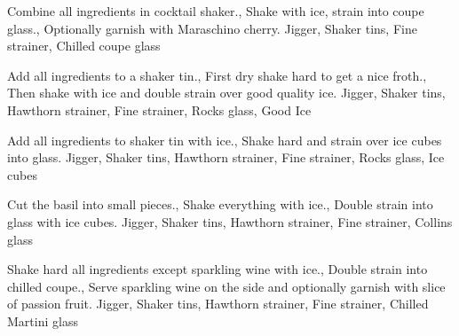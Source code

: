 \documentclass[../main.tex]{subfiles}
\begin{document}

    {
            {Combine all ingredients in cocktail shaker.},
            {Shake with ice, strain into coupe glass.},
            {Optionally garnish with Maraschino cherry.}
    }
    {Jigger, Shaker tins, Fine strainer, Chilled coupe glass}

    \cocktailDivider

    {
            {Add all ingredients to a shaker tin.},
            {First dry shake hard to get a nice froth.},
            {Then shake with ice and double strain over good quality ice.}
    }
    {Jigger, Shaker tins, Hawthorn strainer, Fine strainer, Rocks glass, Good Ice}

    \cocktailDivider

    {
            {Add all ingredients to shaker tin with ice.},
            {Shake hard and strain over ice cubes into glass.}
    }
    {Jigger, Shaker tins, Hawthorn strainer, Fine strainer, Rocks glass, Ice cubes}

    \cocktailDivider

    {
            {Cut the basil into small pieces.},
            {Shake everything with ice.},
            {Double strain into glass with ice cubes.}
    }
    {Jigger, Shaker tins, Hawthorn strainer, Fine strainer, Collins glass}

    \clearpage

    {
            {Shake hard all ingredients except sparkling wine with ice.},
            {Double strain into chilled coupe.},
            {Serve sparkling wine on the side and optionally garnish with slice of passion fruit.}
    }
    {Jigger, Shaker tins, Hawthorn strainer, Fine strainer, Chilled Martini glass}
\end{document}
